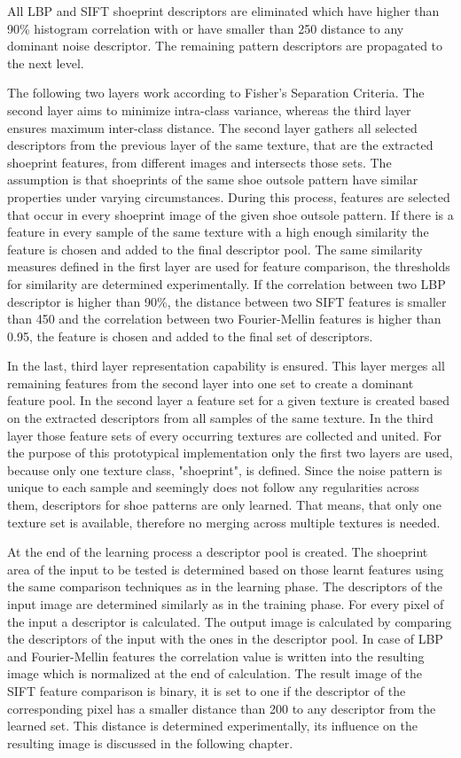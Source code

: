 \documentclass[draft,final]{vutinfth} %
\begin{document}
All LBP and SIFT shoeprint descriptors are eliminated which have higher than 90\% histogram correlation with or have smaller than 250 distance to any dominant noise descriptor.
The remaining pattern descriptors are propagated to the next level. 
\par
The following two layers work according to Fisher's Separation Criteria.
The second layer aims to minimize intra-class variance, whereas the third layer ensures maximum inter-class distance. 
The second layer gathers all selected descriptors from the previous layer of the same texture, that are the extracted shoeprint features, from different images and intersects those sets.
The assumption is that shoeprints of the same shoe outsole pattern have similar properties under varying circumstances.
During this process, features are selected that occur in every shoeprint image of the given shoe outsole pattern.
If there is a feature in every sample of the same texture with a high enough similarity the feature is chosen and added to the final descriptor pool.
The same similarity measures defined in the first layer are used for feature comparison, the thresholds for similarity are determined experimentally.
If the correlation between two LBP descriptor is higher than 90\%, the distance between two SIFT features is smaller than 450 and the correlation between two Fourier-Mellin features is higher than 0.95, the feature is chosen and added to the final set of descriptors.
\par
In the last, third layer representation capability is ensured.
This layer merges all remaining features from the second layer into one set to create a dominant feature pool.
In the second layer a feature set for a given texture is created based on the extracted descriptors from all samples of the same texture.
In the third layer those feature sets of every occurring textures are collected and united.
For the purpose of this prototypical implementation only the first two layers are used, because only one texture class, "shoeprint", is defined.
Since the noise pattern is unique to each sample and seemingly does not follow any regularities across them, descriptors for shoe patterns are only learned.
That means, that only one texture set is available, therefore no merging across multiple textures is needed.
\par
At the end of the learning process a descriptor pool is created.
The shoeprint area of the input to be tested is determined based on those learnt features using the same comparison techniques as in the learning phase.
The descriptors of the input image are determined similarly as in the training phase.
For every pixel of the input a descriptor is calculated.
The output image is calculated by comparing the descriptors of the input with the ones in the descriptor pool.
In case of LBP and Fourier-Mellin features the correlation value is written into the resulting image which is normalized at the end of calculation.
The result image of the SIFT feature comparison is binary, it is set to one if the descriptor of the corresponding pixel has a smaller distance than 200 to any descriptor from the learned set.
This distance is determined experimentally, its influence on the resulting image is discussed in the following chapter.
\end{document}
